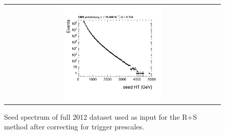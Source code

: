 \begin{figure}[h]
  \centering
  \begin{tabular}{c}
                \includegraphics[width=0.47\textwidth]{figures/HT_data.png}
  \end{tabular}
  \caption{Seed \HT spectrum of full 2012 dataset used as input for the R+S method after correcting for trigger prescales.}
  \label{fig:qcd_rs_seedht}
\end{figure}

